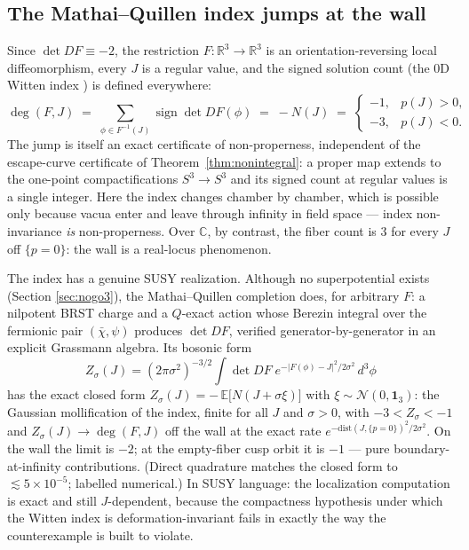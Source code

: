 \documentclass[11pt]{article}
\theoremstyle{definition}
\theoremstyle{remark}
\newcommand{\C}{\mathbb{C}}
\newcommand{\R}{\mathbb{R}}
\newcommand{\E}{\mathbb{E}}
\begin{document}
\subsection{The Mathai--Quillen index jumps at the wall}
\label{sec:witten}

Since $\det DF\equiv-2$, the restriction $F:\R^3\to\R^3$ is an
orientation-reversing local diffeomorphism, every $J$ is a regular
value, and the signed solution count (the 0D Witten index
\cite{Wit82}) is defined everywhere:
\begin{equation}\label{eq:index}
\deg(F,J) \;=\; \sum_{\phi\in F^{-1}(J)}\operatorname{sign}\det DF(\phi)
\;=\; -N(J)\;=\;
\begin{cases} -1, & p(J)>0,\\ -3, & p(J)<0.\end{cases}
\end{equation}
The jump is itself an exact certificate of non-properness, independent
of the escape-curve certificate of Theorem~\ref{thm:nonintegral}: a
proper map extends to the one-point compactifications $S^3\to S^3$ and
its signed count at regular values is a single integer. Here the index
changes chamber by chamber, which is possible only because vacua enter
and leave through infinity in field space --- index non-invariance
\emph{is} non-properness. Over $\C$, by contrast, the fiber count is
$3$ for every $J$ off $\{p=0\}$: the wall is a real-locus phenomenon.

The index has a genuine SUSY realization. Although no superpotential
exists (Section \ref{sec:nogo3}), the Mathai--Quillen completion
\cite{MQ86} does, for arbitrary $F$: a nilpotent BRST charge and a
$Q$-exact action whose Berezin integral over the fermionic pair
$(\bar\chi,\psi)$ produces $\det DF$, verified generator-by-generator
in an explicit Grassmann algebra. Its bosonic form
\[
Z_\sigma(J)=(2\pi\sigma^2)^{-3/2}\!\int \det DF\;
e^{-|F(\phi)-J|^2/2\sigma^2}\,d^3\phi
\]
has the exact closed form $Z_\sigma(J)=-\,\E\bigl[N(J+\sigma\xi)\bigr]$
with $\xi\sim\mathcal N(0,\mathbf 1_3)$: the Gaussian mollification of
the index, finite for all $J$ and $\sigma>0$, with
$-3<Z_\sigma<-1$ and $Z_\sigma(J)\to\deg(F,J)$ off the wall at the
exact rate $e^{-\mathrm{dist}(J,\{p=0\})^2/2\sigma^2}$. On the wall the
limit is $-2$; at the empty-fiber cusp orbit it is $-1$ --- pure
boundary-at-infinity contributions. (Direct quadrature matches the
closed form to $\lesssim 5\times 10^{-5}$; labelled numerical.) In SUSY
language: the localization computation is exact and still
$J$-dependent, because the compactness hypothesis under which the
Witten index is deformation-invariant fails in exactly the way the
counterexample is built to violate.
\end{document}
